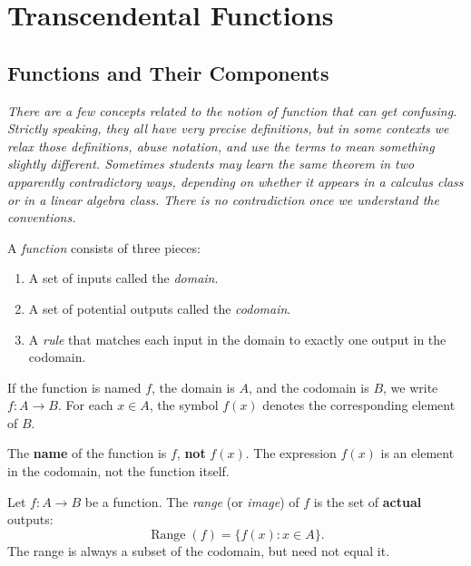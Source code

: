\chapter{Transcendental Functions}

\section{Functions and Their Components}
\label{sec:4.1}

\textit{There are a few concepts related to the notion of function that can get confusing.  Strictly speaking, they all have very precise definitions, but in some contexts we relax those definitions, abuse notation, and use the terms to mean something slightly different.  Sometimes students may learn the same theorem in two apparently contradictory ways, depending on whether it appears in a calculus class or in a linear algebra class.  There is no contradiction once we understand the conventions.}

\begin{definition}[Function]
\label{def:4-1}
A \emph{function} consists of three pieces:
\begin{enumerate}[label=(\roman*)]
  \item A set of inputs called the \emph{domain}.
  \item A set of potential outputs called the \emph{codomain}.
  \item A \emph{rule} that matches each input in the domain to exactly one output in the codomain.
\end{enumerate}
If the function is named $f$, the domain is $A$, and the codomain is $B$, we write $f\colon A \to B$.  For each $x \in A$, the symbol $f(x)$ denotes the corresponding element of $B$.
\end{definition}

\begin{remark}[Warning]
The \textbf{name} of the function is $f$, \textbf{not} $f(x)$.  The expression $f(x)$ is an element in the codomain, not the function itself.
\end{remark}

\begin{definition}[Range]
\label{def:4-2}
Let $f\colon A \to B$ be a function.  The \emph{range} (or \emph{image}) of $f$ is the set of \textbf{actual} outputs:
\[
  \operatorname{Range}(f) = \{f(x) : x \in A\}.
\]
The range is always a subset of the codomain, but need not equal it.
\end{definition}

